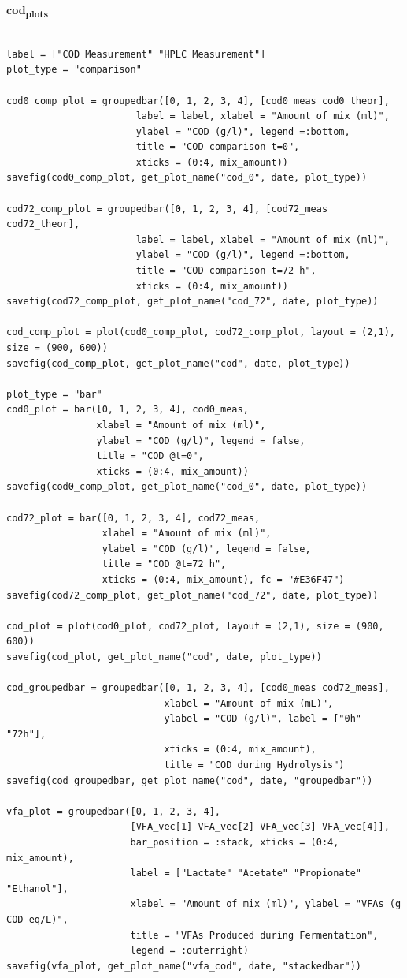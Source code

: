 \documentclass[11pt]{article}
\begin{document}
\textbf{cod\textsubscript{plots}}
\begin{verbatim}

label = ["COD Measurement" "HPLC Measurement"]
plot_type = "comparison"

cod0_comp_plot = groupedbar([0, 1, 2, 3, 4], [cod0_meas cod0_theor],
                       label = label, xlabel = "Amount of mix (ml)",
                       ylabel = "COD (g/l)", legend =:bottom,
                       title = "COD comparison t=0",
                       xticks = (0:4, mix_amount))
savefig(cod0_comp_plot, get_plot_name("cod_0", date, plot_type))

cod72_comp_plot = groupedbar([0, 1, 2, 3, 4], [cod72_meas cod72_theor],
                       label = label, xlabel = "Amount of mix (ml)",
                       ylabel = "COD (g/l)", legend =:bottom,
                       title = "COD comparison t=72 h",
                       xticks = (0:4, mix_amount))
savefig(cod72_comp_plot, get_plot_name("cod_72", date, plot_type))

cod_comp_plot = plot(cod0_comp_plot, cod72_comp_plot, layout = (2,1), size = (900, 600))
savefig(cod_comp_plot, get_plot_name("cod", date, plot_type))

plot_type = "bar"
cod0_plot = bar([0, 1, 2, 3, 4], cod0_meas,
                xlabel = "Amount of mix (ml)",
                ylabel = "COD (g/l)", legend = false,
                title = "COD @t=0",
                xticks = (0:4, mix_amount))
savefig(cod0_comp_plot, get_plot_name("cod_0", date, plot_type))

cod72_plot = bar([0, 1, 2, 3, 4], cod72_meas,
                 xlabel = "Amount of mix (ml)",
                 ylabel = "COD (g/l)", legend = false,
                 title = "COD @t=72 h",
                 xticks = (0:4, mix_amount), fc = "#E36F47")
savefig(cod72_comp_plot, get_plot_name("cod_72", date, plot_type))

cod_plot = plot(cod0_plot, cod72_plot, layout = (2,1), size = (900, 600))
savefig(cod_plot, get_plot_name("cod", date, plot_type))

cod_groupedbar = groupedbar([0, 1, 2, 3, 4], [cod0_meas cod72_meas],
                            xlabel = "Amount of mix (mL)",
                            ylabel = "COD (g/l)", label = ["0h" "72h"],
                            xticks = (0:4, mix_amount),
                            title = "COD during Hydrolysis")
savefig(cod_groupedbar, get_plot_name("cod", date, "groupedbar"))

vfa_plot = groupedbar([0, 1, 2, 3, 4],
                      [VFA_vec[1] VFA_vec[2] VFA_vec[3] VFA_vec[4]],
                      bar_position = :stack, xticks = (0:4, mix_amount),
                      label = ["Lactate" "Acetate" "Propionate" "Ethanol"],
                      xlabel = "Amount of mix (ml)", ylabel = "VFAs (g COD-eq/L)",
                      title = "VFAs Produced during Fermentation",
                      legend = :outerright)
savefig(vfa_plot, get_plot_name("vfa_cod", date, "stackedbar"))
\end{verbatim}
\end{document}
